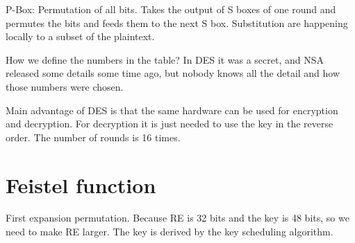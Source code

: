 P-Box: Permutation of all bits. Takes the output of S boxes of one round and permutes the bits and feeds them to the next S box. Substitution are happening locally to a subset of the plaintext.

How we define the numbers in the table? In DES it was a secret, and NSA released some details some time ago, but nobody knows all the detail and how those numbers were chosen.

Main advantage of DES is that the same hardware can be used for encryption and decryption. For decryption it is just needed to use the key in the reverse order.
The number of rounds is 16 times.

\section{Feistel function}

First expansion permutation. Because RE is 32 bits and the key is 48 bits, so we need to make RE larger. The key is derived by the key scheduling algorithm.


